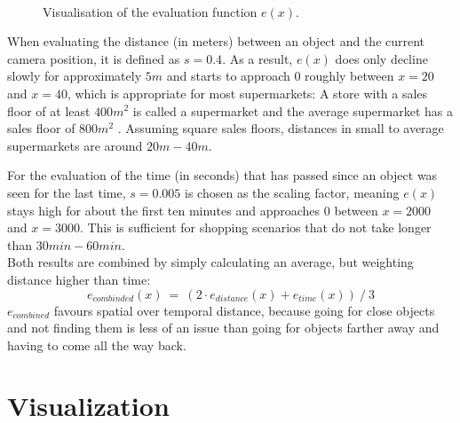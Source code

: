 \begin{figure}[H]
  \centering
  \qquad \\[-0.5ex]
  \label{fig:evaluation}
  \caption[Object relevance evaluation function.]{Visualisation of the evaluation function $e(x)$.}
\end{figure}

When evaluating the distance (in meters) between an object and the current camera position, it is defined as $s = 0.4$. As a result, $e(x)$ does only decline slowly for approximately $5m$ and starts to approach $0$ roughly between $x = 20$ and $x = 40$, which is appropriate for most supermarkets: A store with a sales floor of at least $400m^2$ is called a supermarket and the average supermarket has a sales floor of $800m^2$ . Assuming square sales floors, distances in small to average supermarkets are around $20m - 40m$.

For the evaluation of the time (in seconds) that has passed since an object was seen for the last time, $s = 0.005$ is chosen as the scaling factor, meaning $e(x)$ stays high for about the first ten minutes and approaches $0$ between $x = 2000$ and $x = 3000$. This is sufficient for shopping scenarios that do not take longer than $30min - 60min$. \\

Both results are combined by simply calculating an average, but weighting distance higher than time:
\begin{equation*}
  e_{combinded}(x)\ =\ (2 \cdot e_{distance}(x) + e_{time}(x))\ /\ 3
\end{equation*}
$e_{combined}$ favours spatial over temporal distance, because going for close objects and not finding them is less of an issue than going for objects farther away and having to come all the way back.


\section{Visualization}
\label{sec:impl-viz}

